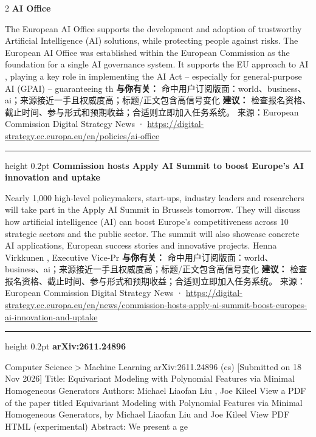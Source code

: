 \documentclass[10.5pt]{ctexart}
\begin{document}
\begin{multicols}{2}
{\large\bfseries AI Office}\par
The European AI Office supports the development and adoption of trustworthy Artificial Intelligence (AI) solutions, while protecting people against risks. The European AI Office was established within the European Commission as the foundation for a single AI governance system. It supports the EU approach to AI , playing a key role in implementing the AI Act – especially for general-purpose AI (GPAI) – guaranteeing th
\textbf{与你有关：} 命中用户订阅版面：world、business、ai；来源接近一手且权威度高；标题/正文包含高信号变化
\textbf{建议：} 检查报名资格、截止时间、参与形式和预期收益；合适则立即加入任务系统。
{\footnotesize\color{ormuted} 来源：European Commission Digital Strategy News · \url{https://digital-strategy.ec.europa.eu/en/policies/ai-office}}
\vspace{2mm}
\hrule height 0.2pt
\vspace{2mm}
{\large\bfseries Commission hosts Apply AI Summit to boost Europe’s AI innovation and uptake}\par
Nearly 1,000 high-level policymakers, start-ups, industry leaders and researchers will take part in the Apply AI Summit in Brussels tomorrow. They will discuss how artificial intelligence (AI) can boost Europe’s competitiveness across 10 strategic sectors and the public sector. The summit will also showcase concrete AI applications, European success stories and innovative projects. Henna Virkkunen , Executive Vice-Pr
\textbf{与你有关：} 命中用户订阅版面：world、business、ai；来源接近一手且权威度高；标题/正文包含高信号变化
\textbf{建议：} 检查报名资格、截止时间、参与形式和预期收益；合适则立即加入任务系统。
{\footnotesize\color{ormuted} 来源：European Commission Digital Strategy News · \url{https://digital-strategy.ec.europa.eu/en/news/commission-hosts-apply-ai-summit-boost-europes-ai-innovation-and-uptake}}
\vspace{2mm}
\hrule height 0.2pt
\vspace{2mm}
{\large\bfseries arXiv:2611.24896}\par
Computer Science > Machine Learning arXiv:2611.24896 (cs) [Submitted on 18 Nov 2026] Title: Equivariant Modeling with Polynomial Features via Minimal Homogeneous Generators Authors: Michael Liaofan Liu , Joe Kileel View a PDF of the paper titled Equivariant Modeling with Polynomial Features via Minimal Homogeneous Generators, by Michael Liaofan Liu and Joe Kileel View PDF HTML (experimental) Abstract: We present a ge

\end{multicols}
\end{document}
